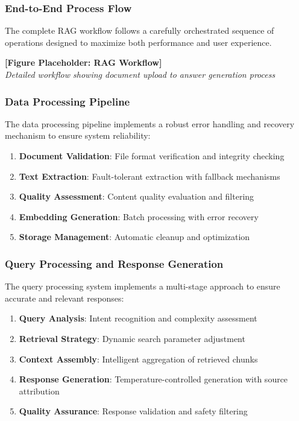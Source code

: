 \documentclass[12pt,letterpaper]{article}
\begin{document}
\subsubsection{End-to-End Process Flow}

The complete RAG workflow follows a carefully orchestrated sequence of operations designed to maximize both performance and user experience.

\begin{center}
\textbf{[Figure Placeholder: RAG Workflow]}\\
\textit{Detailed workflow showing document upload to answer generation process}
\end{center}

\subsubsection{Data Processing Pipeline}

The data processing pipeline implements a robust error handling and recovery mechanism to ensure system reliability:

\begin{enumerate}
    \item \textbf{Document Validation}: File format verification and integrity checking
    \item \textbf{Text Extraction}: Fault-tolerant extraction with fallback mechanisms
    \item \textbf{Quality Assessment}: Content quality evaluation and filtering
    \item \textbf{Embedding Generation}: Batch processing with error recovery
    \item \textbf{Storage Management}: Automatic cleanup and optimization
\end{enumerate}

\subsubsection{Query Processing and Response Generation}

The query processing system implements a multi-stage approach to ensure accurate and relevant responses:

\begin{enumerate}
    \item \textbf{Query Analysis}: Intent recognition and complexity assessment
    \item \textbf{Retrieval Strategy}: Dynamic search parameter adjustment
    \item \textbf{Context Assembly}: Intelligent aggregation of retrieved chunks
    \item \textbf{Response Generation}: Temperature-controlled generation with source attribution
    \item \textbf{Quality Assurance}: Response validation and safety filtering
\end{enumerate}
\end{document}

